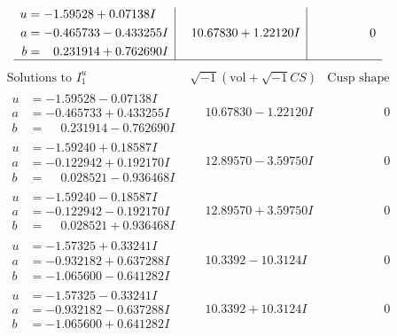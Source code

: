 \documentclass[1p]{elsarticle_modified}
\theoremstyle{definition}
\newcommand{\I}{\sqrt{-1}}
\begin{document}
$$\begin{array}{c|c|c}
\begin{aligned}
u &= -1.59528 + 0.07138 I \\
a &= -0.465733 - 0.433255 I \\
b &= \phantom{-}0.231914 + 0.762690 I\end{aligned}
 & \phantom{-}10.67830 + 1.22120 I & \phantom{-0.000000 } 0\\
 \hline 
 \end{array}$$\newpage$$\begin{array}{c|c|c}  
\text{Solutions to }I^u_{1}& \I (\text{vol} + \sqrt{-1}CS) & \text{Cusp shape}\\
 \hline 
\begin{aligned}
u &= -1.59528 - 0.07138 I \\
a &= -0.465733 + 0.433255 I \\
b &= \phantom{-}0.231914 - 0.762690 I\end{aligned}
 & \phantom{-}10.67830 - 1.22120 I & \phantom{-0.000000 } 0 \\ \hline\begin{aligned}
u &= -1.59240 + 0.18587 I \\
a &= -0.122942 + 0.192170 I \\
b &= \phantom{-}0.028521 - 0.936468 I\end{aligned}
 & \phantom{-}12.89570 - 3.59750 I & \phantom{-0.000000 } 0 \\ \hline\begin{aligned}
u &= -1.59240 - 0.18587 I \\
a &= -0.122942 - 0.192170 I \\
b &= \phantom{-}0.028521 + 0.936468 I\end{aligned}
 & \phantom{-}12.89570 + 3.59750 I & \phantom{-0.000000 } 0 \\ \hline\begin{aligned}
u &= -1.57325 + 0.33241 I \\
a &= -0.932182 + 0.637288 I \\
b &= -1.065600 - 0.641282 I\end{aligned}
 & \phantom{-}10.3392 - 10.3124 I & \phantom{-0.000000 } 0 \\ \hline\begin{aligned}
u &= -1.57325 - 0.33241 I \\
a &= -0.932182 - 0.637288 I \\
b &= -1.065600 + 0.641282 I\end{aligned}
 & \phantom{-}10.3392 + 10.3124 I & \phantom{-0.000000 } 0 \\ \hline\begin{aligned}

\end{aligned}
\end{array}$$
\end{document}

